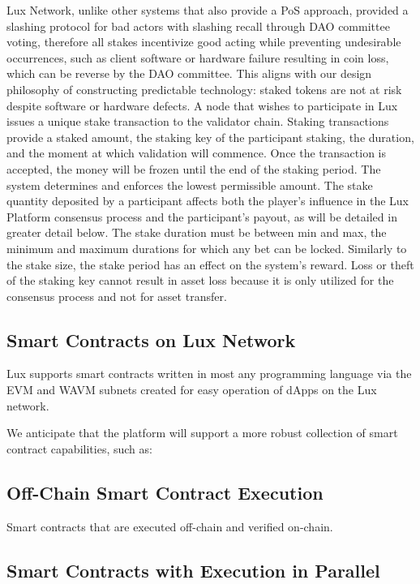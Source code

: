 \documentclass[11pt]{article}
\begin{document}
Lux Network, unlike other systems that also provide a PoS approach, provided a slashing protocol for bad actors with slashing recall through DAO committee voting, therefore all stakes incentivize good acting while preventing undesirable occurrences, such as client software or hardware failure resulting in coin loss, which can be reverse by the DAO committee. This aligns with our design philosophy of constructing predictable technology: staked tokens are not at risk despite software or hardware defects. A node that wishes to participate in Lux issues a unique stake transaction to the validator chain. Staking transactions provide a staked amount, the staking key of the participant staking, the duration, and the moment at which validation will commence. Once the transaction is accepted, the money will be frozen until the end of the staking period. The system determines and enforces the lowest permissible amount. The stake quantity deposited by a participant affects both the player's influence in the Lux Platform consensus process and the participant's payout, as will be detailed in greater detail below. The stake duration must be between min and max, the minimum and maximum durations for which any bet can be locked. Similarly to the stake size, the stake period has an effect on the system's reward. Loss or theft of the staking key cannot result in asset loss because it is only utilized for the consensus process and not for asset transfer.


\subsection{Smart Contracts on Lux Network}

Lux supports smart contracts written in most any programming language via the EVM and WAVM subnets created for easy operation of dApps on the Lux network.


We anticipate that the platform will support a more robust collection of smart contract capabilities, such as:


\subsection{Off-Chain Smart Contract Execution}

Smart contracts that are executed off-chain and verified on-chain.


\subsection{Smart Contracts with Execution in Parallel}
\end{document}
